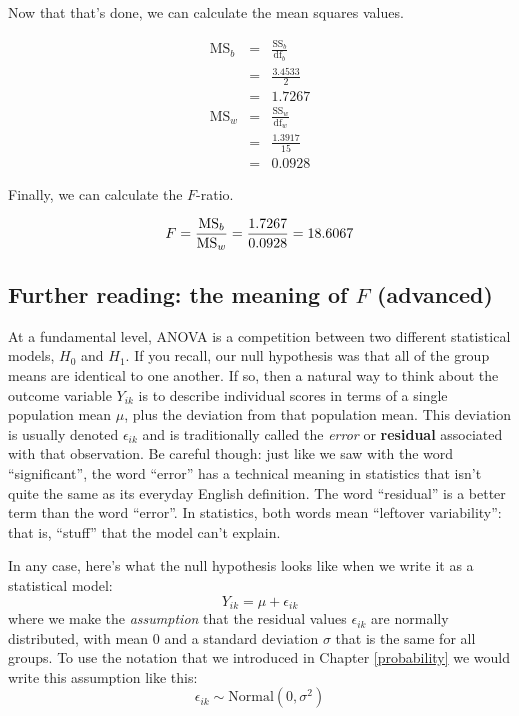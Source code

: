 \documentclass[
]{book}
\theoremstyle{definition}
\theoremstyle{definition}
\theoremstyle{definition}
\theoremstyle{definition}
\theoremstyle{remark}
\begin{document}
Now that that's done, we can calculate the mean squares values.

\[
\begin{array}{lcl}
\mbox{MS}_b &=& \displaystyle\frac{\mbox{SS}_b }{ \mbox{df}_b} 
    \\
    &=& \displaystyle\frac{3.4533}{2}
    \\
    &=& 1.7267 \\
\mbox{MS}_w &=& \displaystyle\frac{\mbox{SS}_w }{ \mbox{df}_w}
    \\
    &=& \displaystyle\frac{1.3917}{15}
    \\
    &=& 0.0928
\end{array}
\]

Finally, we can calculate the \(F\)-ratio.

\[
F = \frac{\mbox{MS}_b }{ \mbox{MS}_w } 
    \\
    = \frac{1.7267}{0.0928}
    \\
    = 18.6067
\]

\hypertarget{anovamodel}{%
\subsection{\texorpdfstring{Further reading: the meaning of \(F\) (advanced)}{Further reading: the meaning of F (advanced)}}\label{anovamodel}}

At a fundamental level, ANOVA is a competition between two different statistical models, \(H_0\) and \(H_1\). If you recall, our null hypothesis was that all of the group means are identical to one another. If so, then a natural way to think about the outcome variable \(Y_{ik}\) is to describe individual scores in terms of a single population mean \(\mu\), plus the deviation from that population mean. This deviation is usually denoted \(\epsilon_{ik}\) and is traditionally called the \emph{error} or \textbf{residual} associated with that observation. Be careful though: just like we saw with the word ``significant'', the word ``error'' has a technical meaning in statistics that isn't quite the same as its everyday English definition. The word ``residual'' is a better term than the word ``error''. In statistics, both words mean ``leftover variability'': that is, ``stuff'' that the model can't explain.

In any case, here's what the null hypothesis looks like when we write it as a statistical model:
\[
Y_{ik} = \mu + \epsilon_{ik}
\]
where we make the \emph{assumption} that the residual values \(\epsilon_{ik}\) are normally distributed, with mean 0 and a standard deviation \(\sigma\) that is the same for all groups. To use the notation that we introduced in Chapter \ref{probability} we would write this assumption like this:
\[
\epsilon_{ik} \sim \mbox{Normal}(0, \sigma^2)
\]
\end{document}
